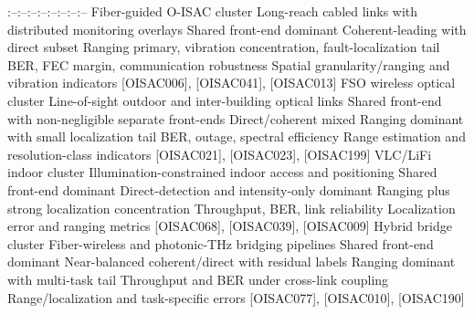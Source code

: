 {}\markdownRendererPipe{}:--\markdownRendererPipe{}:--\markdownRendererPipe{}:--\markdownRendererPipe{}:--\markdownRendererPipe{}:--\markdownRendererPipe{}:--\markdownRendererPipe{}:--\markdownRendererPipe{}:--\markdownRendererPipe{}\markdownRendererSoftLineBreak
{}\markdownRendererPipe{} Fiber-guided O-ISAC cluster \markdownRendererPipe{} Long-reach cabled links with distributed monitoring overlays \markdownRendererPipe{} Shared front-end dominant \markdownRendererPipe{} Coherent-leading with direct subset \markdownRendererPipe{} Ranging primary, vibration concentration, fault-localization tail \markdownRendererPipe{} BER, FEC margin, communication robustness \markdownRendererPipe{} Spatial granularity/ranging and vibration indicators \markdownRendererPipe{} [O\markdownRendererUnderscore{}ISAC\markdownRendererUnderscore{}006], [O\markdownRendererUnderscore{}ISAC\markdownRendererUnderscore{}041], [O\markdownRendererUnderscore{}ISAC\markdownRendererUnderscore{}013] \markdownRendererPipe{}\markdownRendererSoftLineBreak
{}\markdownRendererPipe{} FSO wireless optical cluster \markdownRendererPipe{} Line-of-sight outdoor and inter-building optical links \markdownRendererPipe{} Shared front-end with non-negligible separate front-ends \markdownRendererPipe{} Direct/coherent mixed \markdownRendererPipe{} Ranging dominant with small localization tail \markdownRendererPipe{} BER, outage, spectral efficiency \markdownRendererPipe{} Range estimation and resolution-class indicators \markdownRendererPipe{} [O\markdownRendererUnderscore{}ISAC\markdownRendererUnderscore{}021], [O\markdownRendererUnderscore{}ISAC\markdownRendererUnderscore{}023], [O\markdownRendererUnderscore{}ISAC\markdownRendererUnderscore{}199] \markdownRendererPipe{}\markdownRendererSoftLineBreak
{}\markdownRendererPipe{} VLC/LiFi indoor cluster \markdownRendererPipe{} Illumination-constrained indoor access and positioning \markdownRendererPipe{} Shared front-end dominant \markdownRendererPipe{} Direct-detection and intensity-only dominant \markdownRendererPipe{} Ranging plus strong localization concentration \markdownRendererPipe{} Throughput, BER, link reliability \markdownRendererPipe{} Localization error and ranging metrics \markdownRendererPipe{} [O\markdownRendererUnderscore{}ISAC\markdownRendererUnderscore{}068], [O\markdownRendererUnderscore{}ISAC\markdownRendererUnderscore{}039], [O\markdownRendererUnderscore{}ISAC\markdownRendererUnderscore{}009] \markdownRendererPipe{}\markdownRendererSoftLineBreak
{}\markdownRendererPipe{} Hybrid bridge cluster \markdownRendererPipe{} Fiber-wireless and photonic-THz bridging pipelines \markdownRendererPipe{} Shared front-end dominant \markdownRendererPipe{} Near-balanced coherent/direct with residual labels \markdownRendererPipe{} Ranging dominant with multi-task tail \markdownRendererPipe{} Throughput and BER under cross-link coupling \markdownRendererPipe{} Range/localization and task-specific errors \markdownRendererPipe{} [O\markdownRendererUnderscore{}ISAC\markdownRendererUnderscore{}077], [O\markdownRendererUnderscore{}ISAC\markdownRendererUnderscore{}010], [O\markdownRendererUnderscore{}ISAC\markdownRendererUnderscore{}190] \markdownRendererPipe{}\markdownRendererSoftLineBreak
